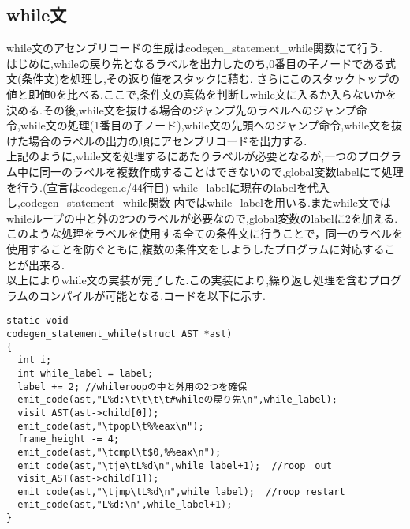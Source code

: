 \documentclass[10pt]{jsarticle}
\begin{document}
\subsection{while文}
while文のアセンブリコードの生成はcodegen\_statement\_while関数にて行う.\\
はじめに,whileの戻り先となるラベルを出力したのち,0番目の子ノードである式文(条件文)を処理し,その返り値をスタックに積む.
さらにこのスタックトップの値と即値0を比べる.ここで,条件文の真偽を判断しwhile文に入るか入らないかを決める.その後,while文を抜ける場合のジャンプ先のラベルへのジャンプ命令,while文の処理(1番目の子ノード),while文の先頭へのジャンプ命令,while文を抜けた場合のラベルの出力の順にアセンブリコードを出力する.\\
上記のように,while文を処理するにあたりラベルが必要となるが,一つのプログラム中に同一のラベルを複数作成することはできないので,global変数labelにて処理を行う.(宣言はcodegen.c/44行目) while\_labelに現在のlabelを代入し,codegen\_statement\_while関数
内ではwhile\_labelを用いる.またwhile文ではwhileループの中と外の2つのラベルが必要なので,global変数のlabelに2を加える.このような処理をラベルを使用する全ての条件文に行うことで，同一のラベルを使用することを防ぐともに,複数の条件文をしようしたプログラムに対応することが出来る.\\
以上によりwhile文の実装が完了した.この実装により,繰り返し処理を含むプログラムのコンパイルが可能となる.コードを以下に示す.
\begin{lstlisting}[caption=codegen\_statement\_while関数]
static void
codegen_statement_while(struct AST *ast)
{
  int i;
  int while_label = label;
  label += 2; //whileroopの中と外用の2つを確保
  emit_code(ast,"L%d:\t\t\t\t#whileの戻り先\n",while_label);
  visit_AST(ast->child[0]);
  emit_code(ast,"\tpopl\t%%eax\n");
  frame_height -= 4;
  emit_code(ast,"\tcmpl\t$0,%%eax\n");
  emit_code(ast,"\tje\tL%d\n",while_label+1);  //roop　out
  visit_AST(ast->child[1]);
  emit_code(ast,"\tjmp\tL%d\n",while_label);  //roop restart
  emit_code(ast,"L%d:\n",while_label+1);
}
\end{lstlisting}
\end{document}
